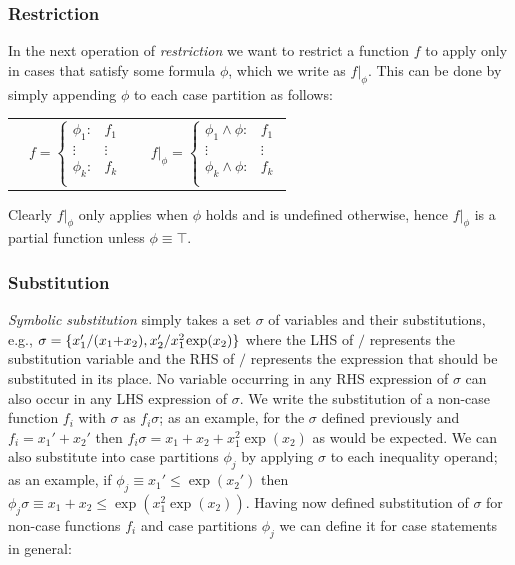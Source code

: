 \documentclass[twoside,11pt]{article}
\begin{document}
\subsubsection*{Restriction}
In the next operation of \emph{restriction} %
we want to restrict a function $f$ to apply only in cases
that satisfy some formula $\phi$, which we write as $f|_{\phi}$.  
This can be done by simply appending $\phi$ to each case partition
as follows:

{%
\begin{center}
\begin{tabular}{r c c l}
&
\hspace{-6mm} 
  $f = \begin{cases}
    \phi_1: & f_1 \\ 
   \vdots&\vdots\\ 
    \phi_k: & f_k \\ 
  \end{cases}$
&

&
\hspace{-2mm}
  $f|_{\phi} = \begin{cases}
    \phi_1 \land \phi : & f_1 \\ 
   \vdots&\vdots\\ 
    \phi_k \land \phi : & f_k \\ 
  \end{cases}$
\end{tabular}
\end{center}
}
Clearly $f|_{\phi}$ only applies when $\phi$ holds and is
undefined otherwise, hence $f|_{\phi}$ is a partial function
unless $\phi \equiv \top$.

\subsubsection*{Substitution}
\emph{Symbolic substitution} simply takes
a set $\sigma$ of variables and their substitutions, e.g., 
$\sigma = \{ x_1' / (x_1 \hspace{-.8mm} + \hspace{-.8mm} x_2), x_2' / x_1^2 \hspace{-.3mm} \exp(x_2) \}$ where
the LHS of $/$ represents the substitution variable and the
RHS of $/$ represents 
the expression that should be substituted in its place.  No variable
occurring in any RHS expression of $\sigma$ can also occur in any 
LHS expression of $\sigma$.
We write the substitution of a non-case function $f_i$ with $\sigma$ 
as $f_i\sigma$; as an example, for the $\sigma$ defined previously and 
$f_i = x_1' + x_2'$ then $f_i\sigma = x_1 + x_2 + x_1^2 \exp(x_2)$ as
would be expected.  We can also substitute into case partitions $\phi_j$
by applying $\sigma$ to each inequality operand; as an example, if
$\phi_j \equiv x_1' \leq \exp(x_2')$ then 
$\phi_j \sigma \equiv x_1 + x_2 \leq \exp(x_1^2 \exp(x_2))$.
Having now defined substitution of $\sigma$ for non-case functions $f_i$ and case
partitions $\phi_j$ we can define it for case statements in general:
\end{document}

